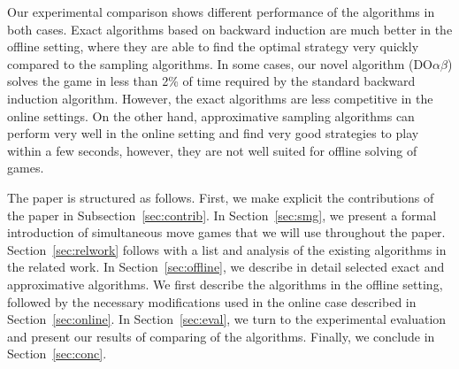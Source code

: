 \documentclass[preprint,12pt]{elsarticle}
\newcommand{\reviewchange}[1]{{\color{blue}#1}}
\newcommand{\doab}[0]{\textrm{DO}\alpha\beta}
\begin{document}
Our experimental comparison shows different performance of the algorithms in both cases.
\reviewchange{Exact algorithms based on backward induction are much better in the offline setting, where they are able to find the optimal strategy very quickly compared to the sampling algorithms.}
In some cases, our novel algorithm ($\doab$) solves the game in less than 2\% of time required by the standard backward induction algorithm.
However, the exact algorithms are less competitive in the online settings.
On the other hand, approximative sampling algorithms can perform very well in the online setting and
find very good strategies to play within a few seconds, however, they are not well suited for offline solving of games.

The paper is structured as follows. \reviewchange{First, we make explicit the contributions of the paper in Subsection~\ref{sec:contrib}.}
In Section~\ref{sec:smg}, we present a formal introduction of simultaneous move games that we will use throughout the paper.
Section~\ref{sec:relwork} follows with a list and analysis of the existing algorithms in the related work. In
Section~\ref{sec:offline}, we describe in detail selected exact and approximative algorithms.
We first describe the algorithms in the offline setting, followed by the necessary modifications used in the online
case described in Section~\ref{sec:online}.
In Section~\ref{sec:eval}, we turn to the experimental evaluation and present our results of comparing of the algorithms.
Finally, we conclude in Section~\ref{sec:conc}.
\end{document}
